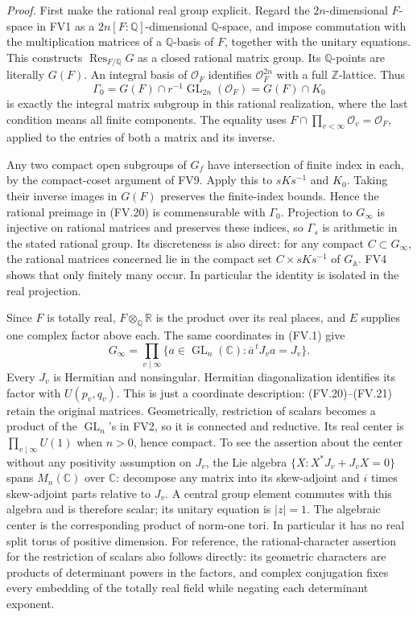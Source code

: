 \emph{Proof.}
First make the rational real group explicit.  Regard the
\(2n\)-dimensional \(F\)-space in FV1 as a
\(2n[F:\mathbb Q]\)-dimensional \(\mathbb Q\)-space, and impose
commutation with the multiplication matrices of a
\(\mathbb Q\)-basis of \(F\), together with the unitary equations.
This constructs \(\operatorname{Res}_{F/\mathbb Q}G\) as a closed
rational matrix group.  Its \(\mathbb Q\)-points are literally
\(G(F)\).  An integral basis of \(\mathcal O_F\) identifies
\(\mathcal O_F^{2n}\) with a full \(\mathbb Z\)-lattice.  Thus
\[
 \Gamma_0=
 G(F)\cap r^{-1}\operatorname{GL}_{2n}(\mathcal O_F)
       =G(F)\cap K_0
 \tag{FV.22}
\]
is exactly the integral matrix subgroup in this rational
realization, where the last condition means all finite components.
The equality uses
\(F\cap\prod_{v<\infty}\mathcal O_v=\mathcal O_F\), applied to
the entries of both a matrix and its inverse.

Any two compact open subgroups of \(G_f\) have intersection of
finite index in each, by the compact-coset argument of FV9.
Apply this to \(sKs^{-1}\) and \(K_0\).  Taking their inverse
images in \(G(F)\) preserves the finite-index bounds.  Hence the
rational preimage in (FV.20) is commensurable with \(\Gamma_0\).
Projection to \(G_\infty\) is injective on rational matrices and
preserves these indices, so \(\Gamma_s\) is arithmetic in the
stated rational group.  Its discreteness is also direct: for any
compact \(C\subset G_\infty\), the rational matrices concerned
lie in the compact set \(C\times sKs^{-1}\) of \(G_{\mathbb A}\).
FV4 shows that only finitely many occur.  In particular the
identity is isolated in the real projection.

Since \(F\) is totally real, \(F\otimes_{\mathbb Q}\mathbb R\)
is the product over its real places, and \(E\) supplies one
complex factor above each.  The same coordinates in (FV.1) give
\[
 G_\infty=
 \prod_{v\mid\infty}
   \{a\in\operatorname{GL}_n(\mathbb C):
                  \overline a^{\,t}J_v a=J_v\}.
 \tag{FV.23}
\]
Every \(J_v\) is Hermitian and nonsingular.  Hermitian
diagonalization identifies its factor with \(U(p_v,q_v)\).
This is just a coordinate description: (FV.20)--(FV.21) retain
the original matrices.  Geometrically, restriction of scalars
becomes a product of the \(\operatorname{GL}_n\)'s in FV2, so
it is connected and reductive.  Its real center is
\(\prod_{v\mid\infty}U(1)\) when \(n>0\), hence compact.
To see the assertion about the center without any positivity
assumption on \(J_v\), the Lie algebra
\(\{X:X^*J_v+J_vX=0\}\) spans \(M_n(\mathbb C)\) over
\(\mathbb C\): decompose any matrix into its skew-adjoint
and \(i\) times skew-adjoint parts relative to \(J_v\).
A central group element commutes with this algebra and is
therefore scalar; its unitary equation is \(|z|=1\).
The algebraic center is the corresponding product of norm-one
tori.  In particular it has no real split torus of positive
dimension.  For reference, the rational-character assertion for
the restriction of scalars also follows directly: its geometric
characters are products of determinant powers in the factors,
and complex conjugation fixes every embedding of the totally
real field while negating each determinant exponent.

